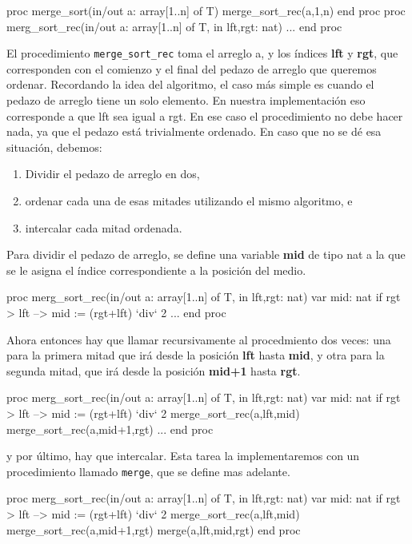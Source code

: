 \begin{pascallike}
proc merge_sort(in/out a: array[1..n] of T)
    merge_sort_rec(a,1,n)
end proc
proc merg_sort_rec(in/out a: array[1..n] of T, in lft,rgt: nat)
...
end proc
\end{pascallike}
El procedimiento \texttt{merge\_sort\_rec} toma el arreglo a, y los índices \textbf{lft} y \textbf{rgt}, que corresponden con el comienzo y el final del pedazo de arreglo que queremos ordenar. Recordando la idea del algoritmo, el caso más simple es cuando el pedazo de arreglo tiene un solo elemento. En nuestra implementación eso corresponde a que lft sea igual a rgt. En ese caso el procedimiento no debe hacer nada, ya que el pedazo está trivialmente ordenado.
En caso que no se dé esa situación, debemos:
\begin{enumerate}
    \item Dividir el pedazo de arreglo en dos,
    \item ordenar cada una de esas mitades utilizando el mismo algoritmo, e
    \item intercalar cada mitad ordenada.
\end{enumerate}
Para dividir el pedazo de arreglo, se define una variable \textbf{mid} de tipo nat a la que se le asigna el índice correspondiente a la posición del medio.
\begin{pascallike}
proc merg_sort_rec(in/out a: array[1..n] of T, in lft,rgt: nat)
    var mid: nat
    if rgt > lft --> mid := (rgt+lft) `div` 2
    ...
end proc
\end{pascallike}
Ahora entonces hay que llamar recursivamente al procedmiento dos veces: una para la primera mitad que irá desde la posición \textbf{lft} hasta \textbf{mid}, y otra para la segunda mitad, que irá desde la posición \textbf{mid+1} hasta \textbf{rgt}.
\begin{pascallike}
proc merg_sort_rec(in/out a: array[1..n] of T, in lft,rgt: nat)
    var mid: nat
    if rgt > lft --> mid := (rgt+lft) `div` 2
    merge_sort_rec(a,lft,mid)
    merge_sort_rec(a,mid+1,rgt)
    ...
end proc
\end{pascallike}
y por último, hay que intercalar. Esta tarea la implementaremos con un procedimiento llamado \texttt{merge}, que se define mas adelante.
\begin{pascallike}
proc merg_sort_rec(in/out a: array[1..n] of T, in lft,rgt: nat)
    var mid: nat
    if rgt > lft --> mid := (rgt+lft) `div` 2
    merge_sort_rec(a,lft,mid)
    merge_sort_rec(a,mid+1,rgt)
    merge(a,lft,mid,rgt)
end proc
\end{pascallike}
